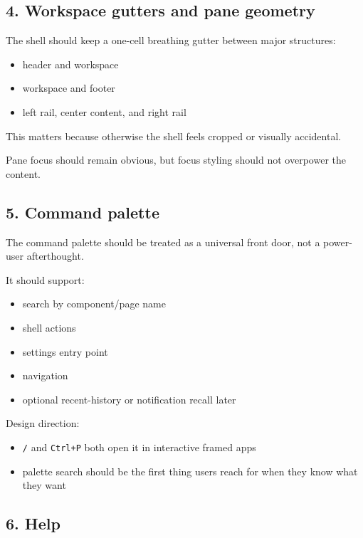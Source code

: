 \subsection{4. Workspace gutters and pane geometry}\label{record-047-workspace-gutters-and-pane-geometry}

The shell should keep a one-cell breathing gutter between major structures:

\begin{itemize}
\tightlist
\item
  header and workspace
\item
  workspace and footer
\item
  left rail, center content, and right rail
\end{itemize}

This matters because otherwise the shell feels cropped or visually accidental.

Pane focus should remain obvious, but focus styling should not overpower the content.

\subsection{5. Command palette}\label{record-047-command-palette}

The command palette should be treated as a universal front door, not a power-user afterthought.

It should support:

\begin{itemize}
\tightlist
\item
  search by component/page name
\item
  shell actions
\item
  settings entry point
\item
  navigation
\item
  optional recent-history or notification recall later
\end{itemize}

Design direction:

\begin{itemize}
\tightlist
\item
  \texttt{/} and \texttt{C\allowbreak{}t\allowbreak{}r\allowbreak{}l\allowbreak{}+\allowbreak{}P} both open it in interactive framed apps
\item
  palette search should be the first thing users reach for when they know what they want
\end{itemize}

\subsection{6. Help}\label{record-047-help}

